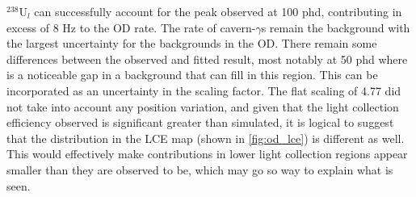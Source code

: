 \par
${}^{238}$U$_l$ can successfully account for the peak observed at 100 phd, contributing in excess of 8 Hz to the OD rate.
The rate of cavern-$\gamma$s remain the background with the largest uncertainty for the backgrounds in the OD.
There remain some differences between the observed and fitted result, most notably at 50 phd where is a noticeable gap in a background that can fill in this region.
This can be incorporated as an uncertainty in the scaling factor.
The flat scaling of 4.77 did not take into account any position variation, and given that the light collection efficiency observed is significant greater than simulated, it is logical to suggest that the distribution in the LCE map (shown in \autoref{fig:od_lce}) is different as well.
This would effectively make contributions in lower light collection regions appear smaller than they are observed to be, which may go so way to explain what is seen.





